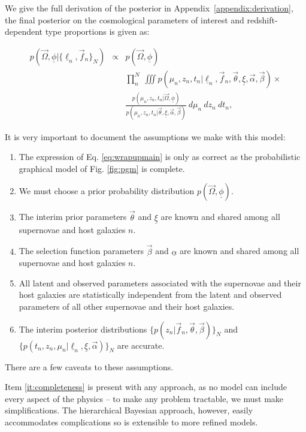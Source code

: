 \documentclass[12pt, onecolumn]{emulateapj}
\newcommand{\textul}{\underline}
\begin{document}
We give the full derivation of the posterior in Appendix~\ref{appendix:derivation}, the final posterior on the cosmological parameters of interest and redshift-dependent type proportions is given as:

\begin{eqnarray}
\label{eq:wrapupmain}
p(\vec{\Omega}, \textul{\phi} | \{\textul{\ell}_{n}, \vec{f}_{n}\}_{N}) &\propto& p(\vec{\Omega}, \textul{\phi})\nonumber \\ &&\prod_{n}^{N}\ \iiint p(\mu_{n}, z_{n}, t_{n} | \textul{\ell}_{n}, \vec{f}_{n}, \vec{\theta}, \textul{\xi}, \vec{\alpha}, \vec{\beta}) \times \nonumber \\ &&\frac{p(\mu_{n}, z_{n}, t_{n} | \vec{\Omega}, \textul{\phi})}{p(\mu_{n}, z_{n}, t_{n} | \vec{\theta}, \textul{\xi}, \vec{\alpha}, \vec{\beta})}\ d\mu_{n}\ dz_{n}\ dt_{n},
\end{eqnarray}




It is very important to document the assumptions we make with this model:
\begin{enumerate}
	\item\label{it:completeness} The expression of Eq. \ref{eq:wrapupmain} is only as correct as the probabilistic graphical model of Fig. \ref{fig:pgm} is complete.
	\item\label{it:prior} We must choose a prior probability distribution $p(\vec{\Omega}, \textul{\phi})$.
	\item\label{it:interimpriors} The interim prior parameters $\vec{\theta}$ and $\textul{\xi}$ are known and shared among all supernovae and host galaxies $n$.
	\item\label{it:selectionfunctions} The selection function parameters $\vec{\beta}$ and $\textul{\alpha}$ are known and shared among all supernovae and host galaxies $n$.
	\item\label{it:independence} All latent and observed parameters associated with the supernovae and their host galaxies are statistically independent from the latent and observed parameters of all other supernovae and their host galaxies.
	\item\label{it:accuracy} The interim posterior distributions $\{p(z_{n} | \vec{f}_{n}, \vec{\theta}, \vec{\beta})\}_{N}$ and $\{p(t_{n}, z_{n}, \mu_{n} | \textul{\ell}_{n}, \textul{\xi}, \vec{\alpha})\}_{N}$ are accurate.
\end{enumerate}
There are a few caveats to these assumptions.  

Item \ref{it:completeness} is present with any approach, as no model can include every aspect of the physics -- to make any problem tractable, we must make simplifications.  The hierarchical Bayesian approach, however, easily accommodates complications so is extensible to more refined models.
\end{document}
